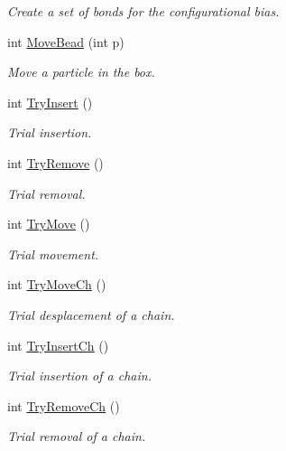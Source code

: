 \begin{DoxyCompactItemize}
\begin{DoxyCompactList}\small\item\em \-Create a set of bonds for the configurational bias. \end{DoxyCompactList}\item 
int \hyperlink{classForces_aaa86df6dc24f47e52ca153db60bd6749}{\-Move\-Bead} (int p)
\begin{DoxyCompactList}\small\item\em \-Move a particle in the box. \end{DoxyCompactList}\item 
int \hyperlink{classForces_a56709cda842db1c6f3813acc5bca5237}{\-Try\-Insert} ()
\begin{DoxyCompactList}\small\item\em \-Trial insertion. \end{DoxyCompactList}\item 
int \hyperlink{classForces_a0658783c2d6dcab7a875f938747255a6}{\-Try\-Remove} ()
\begin{DoxyCompactList}\small\item\em \-Trial removal. \end{DoxyCompactList}\item 
int \hyperlink{classForces_ad69656acc46a08f2361dbe5b1067dffa}{\-Try\-Move} ()
\begin{DoxyCompactList}\small\item\em \-Trial movement. \end{DoxyCompactList}\item 
int \hyperlink{classForces_aa30016ca75ff4d48a905a9dad7da023f}{\-Try\-Move\-Ch} ()
\begin{DoxyCompactList}\small\item\em \-Trial desplacement of a chain. \end{DoxyCompactList}\item 
int \hyperlink{classForces_ab7bfa9d7122c69b311f666740653bd0b}{\-Try\-Insert\-Ch} ()
\begin{DoxyCompactList}\small\item\em \-Trial insertion of a chain. \end{DoxyCompactList}\item 
int \hyperlink{classForces_aefc3ccff8a9805e952ddc49194595844}{\-Try\-Remove\-Ch} ()
\begin{DoxyCompactList}\small\item\em \-Trial removal of a chain. \end{DoxyCompactList}\item 

\end{DoxyCompactItemize}
